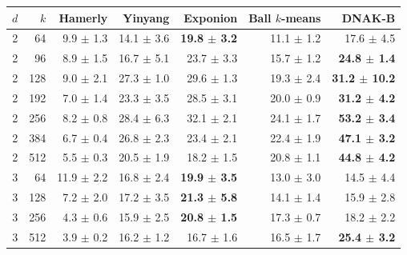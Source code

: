 \begin{tabular}{rrrrrrr}
\toprule
$d$ & $k$ & Hamerly & Yinyang & Exponion & Ball $k$-means & DNAK-B \\
\midrule
2 & 64 & 9.9 $\pm$ 1.3 & 14.1 $\pm$ 3.6 & \textbf{19.8 $\pm$ 3.2} & 11.1 $\pm$ 1.2 & 17.6 $\pm$ 4.5 \\
2 & 96 & 8.9 $\pm$ 1.5 & 16.7 $\pm$ 5.1 & 23.7 $\pm$ 3.3 & 15.7 $\pm$ 1.2 & \textbf{24.8 $\pm$ 1.4} \\
2 & 128 & 9.0 $\pm$ 2.1 & 27.3 $\pm$ 1.0 & 29.6 $\pm$ 1.3 & 19.3 $\pm$ 2.4 & \textbf{31.2 $\pm$ 10.2} \\
2 & 192 & 7.0 $\pm$ 1.4 & 23.3 $\pm$ 3.5 & 28.5 $\pm$ 3.1 & 20.0 $\pm$ 0.9 & \textbf{31.2 $\pm$ 4.2} \\
2 & 256 & 8.2 $\pm$ 0.8 & 28.4 $\pm$ 6.3 & 32.1 $\pm$ 2.1 & 24.1 $\pm$ 1.7 & \textbf{53.2 $\pm$ 3.4} \\
2 & 384 & 6.7 $\pm$ 0.4 & 26.8 $\pm$ 2.3 & 23.4 $\pm$ 2.1 & 22.4 $\pm$ 1.9 & \textbf{47.1 $\pm$ 3.2} \\
2 & 512 & 5.5 $\pm$ 0.3 & 20.5 $\pm$ 1.9 & 18.2 $\pm$ 1.5 & 20.8 $\pm$ 1.1 & \textbf{44.8 $\pm$ 4.2} \\
\midrule
3 & 64 & 11.9 $\pm$ 2.2 & 16.8 $\pm$ 2.4 & \textbf{19.9 $\pm$ 3.5} & 13.0 $\pm$ 3.0 & 14.5 $\pm$ 4.4 \\
3 & 128 & 7.2 $\pm$ 2.0 & 17.2 $\pm$ 3.5 & \textbf{21.3 $\pm$ 5.8} & 14.1 $\pm$ 1.4 & 15.9 $\pm$ 2.8 \\
3 & 256 & 4.3 $\pm$ 0.6 & 15.9 $\pm$ 2.5 & \textbf{20.8 $\pm$ 1.5} & 17.3 $\pm$ 0.7 & 18.2 $\pm$ 2.2 \\
3 & 512 & 3.9 $\pm$ 0.2 & 16.2 $\pm$ 1.2 & 16.7 $\pm$ 1.6 & 16.5 $\pm$ 1.7 & \textbf{25.4 $\pm$ 3.2} \\
\bottomrule
\end{tabular}
